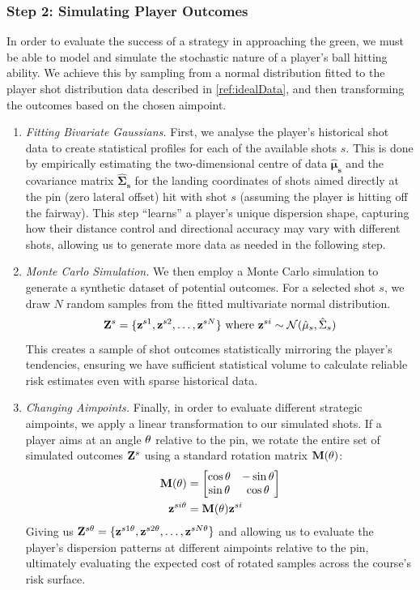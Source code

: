 \documentclass[11pt, letterpaper]{article}
\begin{document}
\subsubsection{Step 2: Simulating Player Outcomes}
\label{subsec: playerSim}
In order to evaluate the success of a strategy in approaching the green, we must be able to model and simulate the stochastic nature of a player's ball hitting ability. We achieve this by sampling from a normal distribution fitted to the player shot distribution data described in \ref{ref:idealData}, and then transforming the outcomes based on the chosen aimpoint.

\begin{enumerate}
    \item \textit{Fitting Bivariate Gaussians.} First, we analyse the player's historical shot data to create statistical profiles for each of the available shots $s$. This is done by empirically estimating the two-dimensional centre of data $\mathbf{\hat\mu_s}$ and the covariance matrix $\mathbf{\hat\Sigma_s}$ for the landing coordinates of shots aimed directly at the pin (zero lateral offset) hit with shot $s$ (assuming the player is hitting off the fairway). This step ``learns'' a player's unique dispersion shape, capturing how their distance control and directional accuracy may vary with different shots, allowing us to generate more data as needed in the following step.
     \item \textit{Monte Carlo Simulation.} We then employ a Monte Carlo simulation to generate a synthetic dataset of potential outcomes. For a selected shot $s$, we draw $N$ random samples from the fitted multivariate normal distribution. 
     $$\mathbf{Z}^s = \{\mathbf{z}^{s1}, \mathbf{z}^{s2}, \ldots, \mathbf{z}^{sN}\} \text{ where } \mathbf{z}^{si} \sim \mathcal{N}(\hat\mu_s, \hat\Sigma_s)$$
     This creates a sample of shot outcomes statistically mirroring the player's tendencies,  ensuring we have sufficient statistical volume to calculate reliable risk estimates even with sparse historical data. 

     \item \textit{Changing Aimpoints.} Finally, in order to evaluate different strategic aimpoints, we apply a linear transformation to our simulated shots. If a player aims at an angle $\theta$ relative to the pin, we rotate the entire set of simulated outcomes $\mathbf{Z}^s$ using a standard rotation matrix $\mathbf{M} (\theta)$: 
     \begin{align*}
         \mathbf{M} (\theta) &= \begin{bmatrix}
             \cos \theta & - \sin \theta \\
             \sin \theta & \cos \theta
         \end{bmatrix} \\
         \mathbf{z}^{si\theta} &= \mathbf{M}(\theta)\mathbf{z}^{si}
     \end{align*}
     Giving us $\mathbf{Z}^{s\theta} =  \{\mathbf{z}^{s1\theta}, \mathbf{z}^{s2\theta}, \ldots, \mathbf{z}^{sN\theta}\}$ and allowing us to evaluate the player's dispersion patterns at different aimpoints relative to the pin, ultimately evaluating the expected cost of rotated samples across the course's risk surface.
\end{enumerate}
\end{document}
